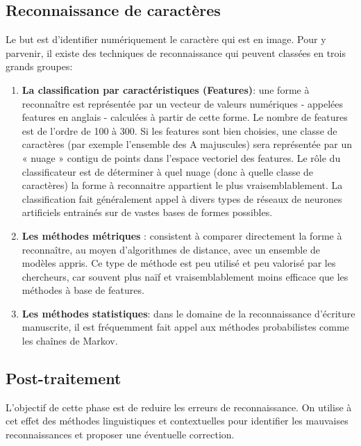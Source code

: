     \subsection{Reconnaissance de caractères}
    Le but est d'identifier numériquement le caractère qui est en image. Pour y parvenir, il existe des techniques de reconnaissance qui peuvent classées en trois grands groupes:
        \begin{enumerate}
            \item \textbf{La classification par caractéristiques (Features)}: une forme à reconnaître est représentée par un vecteur de valeurs numériques - appelées features en anglais - calculées à partir de cette forme. Le nombre de features est de l'ordre de 100 à 300. Si les features sont bien choisies, une classe de caractères (par exemple l'ensemble des A majuscules) sera représentée par un « nuage » contigu de points dans l'espace vectoriel des features. Le rôle du classificateur est de déterminer à quel nuage (donc à quelle classe de caractères) la forme à reconnaitre appartient le plus vraisemblablement. La classification fait généralement appel à divers types de réseaux de neurones artificiels entrainés sur de vastes bases de formes possibles.
            \item \textbf{Les méthodes métriques} : consistent à comparer directement la forme à reconnaître, au moyen d'algorithmes de distance, avec un ensemble de modèles appris. Ce type de méthode est peu utilisé et peu valorisé par les chercheurs, car souvent plus naïf et vraisemblablement moins efficace que les méthodes à base de features.
            \item \textbf{Les méthodes statistiques}: dans le domaine de la reconnaissance d'écriture manuscrite, il est fréquemment fait appel aux méthodes probabilistes comme les chaînes de Markov.\cite{wikiOCR}
        \end{enumerate}

    \subsection{Post-traitement}
    L'objectif de cette phase est de reduire les erreurs de reconnaissance. On utilise à cet effet des méthodes linguistiques et contextuelles pour identifier les mauvaises reconnaissances et proposer une éventuelle correction. 